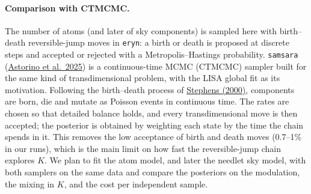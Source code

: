 \documentclass[11pt,a4paper]{article}
\begin{document}
\paragraph{Comparison with CTMCMC.} The number of atoms (and later of sky
components) is sampled here with birth--death reversible-jump moves in \texttt{eryn}:
a birth or death is proposed at discrete steps and accepted or rejected with a
Metropolis--Hastings probability. \texttt{samsara}
(\href{https://arxiv.org/abs/2511.07385}{Astorino et al.\ 2025}) is a continuous-time
MCMC (CTMCMC) sampler built for the same kind of transdimensional problem, with the
LISA global fit as its motivation. Following the birth--death process of
\href{https://doi.org/10.1214/aos/1016120364}{Stephens (2000)}, components are born,
die and mutate as Poisson events in continuous time. The rates are chosen so that
detailed balance holds, and every transdimensional move is then accepted; the
posterior is obtained by weighting each state by the time the chain spends in it. This
removes the low acceptance of birth and death moves (0.7--1\% in our runs), which is
the main limit on how fast the reversible-jump chain explores $K$. We plan to fit the
atom model, and later the needlet sky model, with both samplers on the same data and
compare the posteriors on the modulation, the mixing in $K$, and the cost per
independent sample.

\end{document}
